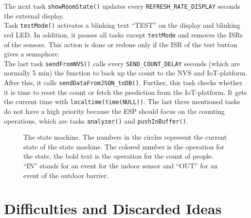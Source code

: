 The next task \verb!showRoomState()! updates every \verb!REFRESH_RATE_DISPLAY! seconds the external display.\\
Task \verb!testMode()! activates a blinking text ``TEST'' on the display and blinking red LED. In addition,
it pauses all tasks except \verb!testMode! and removes the ISRs of the sensors. This action is done or redone
only if the ISR of the test button gives a semaphore.\\
The last task \verb!sendFromNVS()! calls every \verb!SEND_COUNT_DELAY! seconds (which are normally 5 min)
the function to back up the count to the NVS and IoT-platform. After this, it calls \verb!sendDataFromJSON_toDB()!.
Further, this task checks whether it is time to reset the count or fetch the prediction from the IoT-platform.
It gets the current time with \verb!localtime(time(NULL))!.
The last three mentioned tasks do not have a high priority because the ESP should focus on the counting
operations, which are tasks \verb!analyzer()! and \verb!pushInBuffer()!.



\begin{figure}%
    \centering
    \resizebox{1\textwidth}{!}{
        
    }
    \caption[The used state machine]{The state machine. The numbers in the circles represent the current state
        of the state machine. The colored number is the operation for the state, the bold text is the operation
        for the count of people. ``IN'' stands for an event for the indoor sensor and ``OUT'' for an event
        of the outdoor barrier.}
    \label{fig_stateMachine}
\end{figure}




\section{Difficulties and Discarded Ideas}\label{diff_and_ideas}

